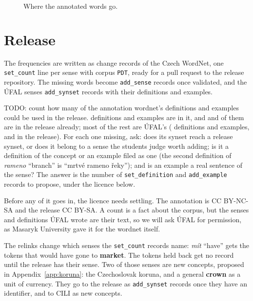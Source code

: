 \documentclass[a4paper,12pt]{article}
\begin{document}
\begin{figure}[ht]
  \centering
  \caption{Where the annotated words go.}
  \label{fig:flow}
\end{figure}

\section{Release}
\label{sec:release}

The frequencies are written as  change records of the
Czech WordNet, one \texttt{set\_count} line per sense with corpus
\texttt{PDT}, ready for a pull request to the release repository.  The
missing words become \texttt{add\_sense} records once validated, and the
ÚFAL senses \texttt{add\_synset} records with their definitions and examples.

TODO: count how many of the annotation wordnet's definitions and examples
could be used in the release.   definitions and
 examples are in it, and  and
 of them are in the release already; most of the
rest are ÚFAL's ( definitions and
 examples,  and
 in the release).  For each one missing, ask:
does its synset reach a release synset, or does it belong to a sense the
students judge worth adding; is it a definition of the concept or
an example filed as one (the second definition of \textit{rameno}
``branch'' is ``mrtvé rameno řeky''); and is an example a real sentence of the sense?
The answer is the number of \texttt{set\_definition} and
\texttt{add\_example} records to propose, under the licence below.

Before any of it goes in, the licence needs settling.  The annotation is
CC BY-NC-SA and the release CC BY-SA.  A count is a fact about the corpus,
but the senses and definitions ÚFAL wrote are their text, so we will ask
ÚFAL for permission, as Masaryk University gave it for the wordnet itself.

The relinks change which senses the \texttt{set\_count} records name:
\textit{mít} ``have'' gets the  tokens that
would have gone to \textbf{market}.  The tokens held back get no record
until the release has their sense.  Two of those senses are new concepts,
proposed in Appendix~\ref{app:koruna}: the Czechoslovak koruna, and a
general \textbf{crown} as a unit of currency.  They go to the release
as \texttt{add\_synset} records once they have an identifier, and to
CILI as new concepts.
\end{document}
